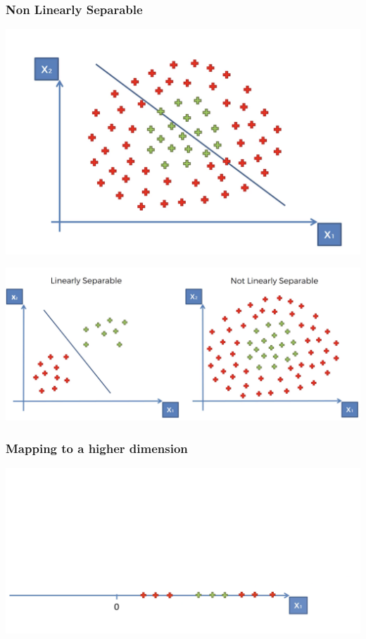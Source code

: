 \documentclass[compress, aspectratio=54]{beamer}
\begin{document}
 \begin{frame}

\frametitle{Non Linearly Separable}

\includegraphics[width=0.85\linewidth ]{Figures/svm-3.png}


\end{frame}
 \begin{frame}

\includegraphics[width=0.85\linewidth ]{Figures/svm-4.png}


\end{frame}

\begin{frame}
\frametitle{Mapping to a higher dimension}
\includegraphics[width=0.85\linewidth ]{Figures/svm-f.png}


\end{frame}
\end{document}
